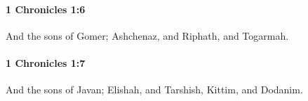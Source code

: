 		\paragraph{1 Chronicles 1:6} %
			\label{1CHRONICLES-1-6}

			And the sons of Gomer; Ashchenaz, and Riphath, and Togarmah.


		\paragraph{1 Chronicles 1:7} %
			\label{1CHRONICLES-1-7}

			And the sons of Javan; Elishah, and Tarshish, Kittim, and Dodanim.


